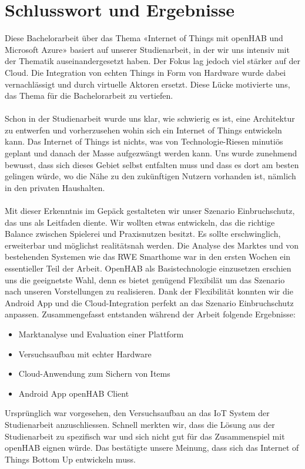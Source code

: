 \section{Schlusswort und Ergebnisse}

Diese Bachelorarbeit über das Thema «Internet of Things mit openHAB und Microsoft Azure» basiert auf unserer Studienarbeit, in der wir uns intensiv mit der Thematik auseinandergesetzt haben. Der Fokus lag jedoch viel stärker auf der Cloud. Die Integration von echten Things in Form von Hardware wurde dabei vernachlässigt und durch virtuelle Aktoren ersetzt. Diese Lücke motivierte uns, das Thema für die Bachelorarbeit zu vertiefen.\\ \\
Schon in der Studienarbeit wurde uns klar, wie schwierig es ist, eine Architektur zu entwerfen und vorherzusehen wohin sich ein Internet of Things entwickeln kann. Das Internet of Things ist nichts, was von Technologie-Riesen minutiös geplant und danach der Masse aufgezwängt werden kann. Uns wurde zunehmend bewusst, dass sich dieses Gebiet selbst entfalten muss und dass es dort am besten gelingen würde, wo die Nähe zu den zukünftigen Nutzern vorhanden ist, nämlich in den privaten Haushalten.\\ \\
Mit dieser Erkenntnis im Gepäck gestalteten wir unser Szenario Einbruchschutz, das uns als Leitfaden diente. Wir wollten etwas entwickeln, das die richtige Balance zwischen Spielerei und Praxisnutzen besitzt. Es sollte erschwinglich, erweiterbar und möglichst realitätsnah werden. Die Analyse des Marktes und von bestehenden Systemen wie das RWE Smarthome war in den ersten Wochen ein essentieller Teil der Arbeit. OpenHAB als Basistechnologie einzusetzen erschien uns die geeignetste Wahl, denn es bietet genügend Flexibilät um das Szenario nach unseren Vorstellungen zu realisieren. Dank der Flexibilität konnten wir die Android App und die Cloud-Integration perfekt an das Szenario Einbruchschutz anpassen. Zusammengefasst entstanden während der Arbeit folgende Ergebnisse:
\begin{itemize}
	\item Marktanalyse und Evaluation einer Plattform
	\item Versuchsaufbau mit echter Hardware
	\item Cloud-Anwendung zum Sichern von Items
	\item Android App openHAB Client
\end{itemize}
Ursprünglich war vorgesehen, den Versuchsaufbau an das IoT System der Studienarbeit anzuschliessen. Schnell merkten wir, dass die Lösung aus der Studienarbeit zu spezifisch war und sich nicht gut für das Zusammenspiel mit openHAB eignen würde. Das bestätigte unsere Meinung, dass sich das Internet of Things Bottom Up entwickeln muss. 
